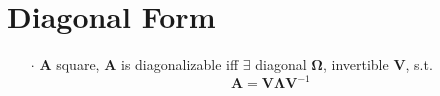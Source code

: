 \documentclass[a4paper, 11pt]{article}
\newcommand{\boxwidth}{430pt}
\begin{document}
\section{Diagonal Form}
\begin{itemize}
  \item[$\cdot$] $\pmb{A}$ square, $\pmb{A}$ is diagonalizable iff $\exists$ diagonal $\pmb{\Omega}$, invertible $\pmb{V}$, s.t.
  $$
  \pmb{A} = \pmb{V} \pmb{\Lambda} \pmb{V}^{-1} 
  $$
\end{itemize}
\fbox{
	\parbox{\boxwidth}{
	1
	}
}
\end{document}
